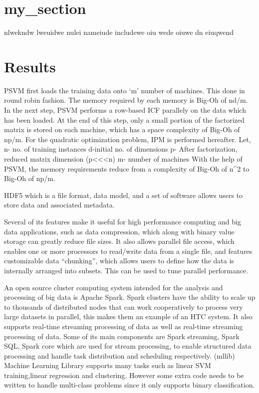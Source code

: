 \documentclass[aps,floatfix,prd,showpacs]{revtex4}
\begin{document}
\section{my_section}

nlwekndw lweuidwe nulei nameiude includewe oiu wede oiuwe dn eiuqwend

\section{Results}
PSVM first loads the training data onto ‘m’ number of machines. This done in round robin fashion. The memory required by each memory is Big-Oh of nd/m. In the next step, PSVM performs a row-based ICF parallely on the data which has been loaded. At the end of this step, only a small portion of the factorized matrix is stored on each machine, which has a space complexity of Big-Oh of np/m. For the quadratic optimization problem, IPM is performed hereafter. Let, n- no. of training instances d-initial no. of dimensions p- After factorization, reduced matrix dimension (p<<<n) m- number of machines With the help of PSVM, the memory requirements reduce from a complexity of Big-Oh of n^2 to Big-Oh of np/m.  
 
HDF5 which is a file format, data model, and a set of software allows users to store data and associated metadata. 

Several of its features make it useful for high performance computing and big data applications, such as data compression, which along with binary value storage can greatly reduce file sizes. It also allows parallel file access, which enables one or more processors to read/write data from a single file, and features customizable data “chunking”, which allows users to define how the data is internally arranged into subsets. This can be used to tune parallel performance. 

An open source cluster computing system intended for the analysis and processing of big data is Apache Spark. Spark clusters have the ability to scale up to thousands of distributed nodes that can work cooperatively to process very large datasets in parallel, this makes them an example of an HTC system. It also supports real-time streaming processing of data as well as real-time streaming processing of data. Some of its main components are Spark streaming, Spark SQL, Spark core which are used for stream processing, to enable structured data processing and handle task distribution and scheduling respectively. (mllib) Machine Learning Library supports many tasks such as linear SVM training,linear regression and clustering. However some extra code needs to be written to handle multi-class problems since it only supports binary classification. 
 
\end{document}
